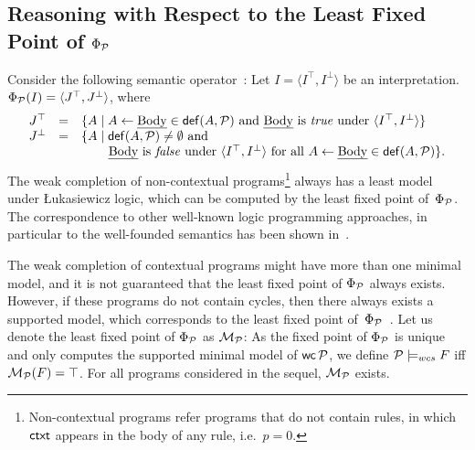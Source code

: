 \documentclass[12pt]{article}
\begin{document}
\subsection{Reasoning with Respect to the Least Fixed Point of $\Phi_{{\cal P}}$}\label{sect:lfp}


Consider the following semantic operator~\cite{stenning:vanlambalgen:2008}: Let $I = \langle I^\top,I^\bot
\rangle$ be an interpretation. $\Phi_{\cal P} (I) =
\langle J^\top,J^\bot\rangle$, where
\[
\begin{array}{lcl}
J^\top & = & \{ A \mid A \leftarrow \Body \in \Def(A,\CalP)
\mbox{ and
} \Body \mbox{ is \True under } \langle I^\top,I^\bot \rangle \} \\
J^\bot & = & \{ A \mid \Def(A,\CalP) \neq \emptyset \mbox{ and }\\
&& \rule{7.5mm}{0mm}\Body \mbox{ is \False under } \langle
I^\top,I^\bot \rangle \mbox{ for all }  A \leftarrow \Body \in \Def(A,\CalP)\}.
\end{array}\Shrink
\]
The weak completion of non-contextual programs\footnote{Non-contextual programs refer programs that do not contain rules, in which $\mathsf{ctxt}$ appears in the body of any rule, i.e.\ $p = 0$.} 
always has a least model under  {\L}ukasiewicz logic,
which can be computed by the least fixed point of~$\Phi_{{\cal P}}$\cite{hk:2009a}. The correspondence to other well-known logic programming approaches, in particular 
to the well-founded semantics has been shown in~\cite{dietz:hoelldobler:wernhard:2014}.
 
The weak completion of contextual
programs might have more than one minimal model, and it is not guaranteed that 
the least fixed point of $\Phi_{{\cal P}}$ always exists. However,
if these programs do not contain cycles, then there always exists a supported model, which 
corresponds to the least fixed point of~$\Phi_{{\cal P}}$~\cite{dietz:hoelldobler:pereira:2017,dietz:hoelldobler:philipp:2017}.
Let us denote the least fixed point of $\Phi_{{\cal P}}$ as ${\cal M}_{\cal P}$:
As the fixed point of $\Phi_{{\cal P}}$ is unique and only computes the supported minimal model of $\mathsf{wc}\,{\cal P}$, we define
${\cal P} \models_{wcs} F$ iff ${\cal M}_{\cal P}(F) = \top$.
For all programs considered in the sequel, ${\cal M}_{\cal P}$ exists.
\end{document}
